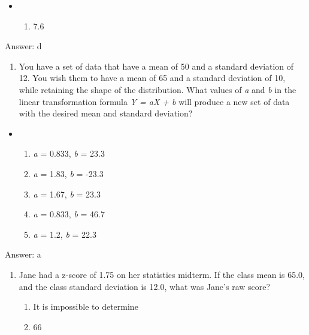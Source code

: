 \documentclass[]{article}
\providecommand{\tightlist}{%
  \setlength{\itemsep}{0pt}\setlength{\parskip}{0pt}}
\begin{document}
\begin{itemize}
\item
  \begin{enumerate}
  \def\labelenumi{\alph{enumi}.}
  \setcounter{enumi}{3}
  \tightlist
  \item
    7.6
  \end{enumerate}
\end{itemize}

Answer: d

\begin{enumerate}
\def\labelenumi{\arabic{enumi}.}
\setcounter{enumi}{1}
\tightlist
\item
  You have a set of data that have a mean of 50 and a standard deviation
  of 12. You wish them to have a mean of 65 and a standard deviation of
  10, while retaining the shape of the distribution. What values of
  \emph{a} and \emph{b} in the linear transformation formula \emph{Y =
  aX + b} will produce a new set of data with the desired mean and
  standard deviation?
\end{enumerate}

\begin{itemize}
\item
  \begin{enumerate}
  \def\labelenumi{\alph{enumi}.}
  \item
    \emph{a} = 0.833, \emph{b} = 23.3
  \item
    \emph{a} = 1.83, \emph{b} = -23.3
  \item
    \emph{a} = 1.67, \emph{b} = 23.3
  \item
    \emph{a} = 0.833, \emph{b} = 46.7
  \item
    \emph{a} = 1.2, \emph{b} = 22.3
  \end{enumerate}
\end{itemize}

Answer: a

\begin{enumerate}
\def\labelenumi{\arabic{enumi}.}
\setcounter{enumi}{2}
\item
  Jane had a z-score of 1.75 on her statistics midterm. If the class
  mean is 65.0, and the class standard deviation is 12.0, what was
  Jane's raw score?

  \begin{enumerate}
  \def\labelenumii{\alph{enumii}.}
  \tightlist
  \item
    It is impossible to determine
  \item
    66
  \end{enumerate}
\end{enumerate}
\end{document}
